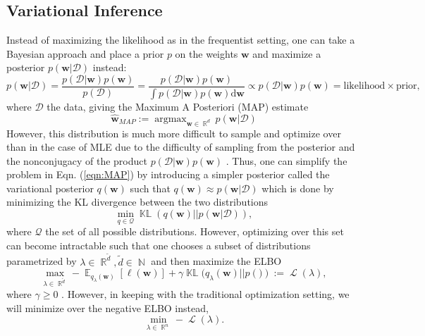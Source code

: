 \documentclass[a4paper, 11pt, oneside]{scrartcl}
\theoremstyle{break}
\DeclareMathOperator*{\argmax}{argmax}
\DeclareMathOperator{\Natural}{\mathbb{N}}
\DeclareMathOperator{\Real}{\mathbb{R}}
\DeclareMathOperator{\Expect}{\mathbb{E}}
\DeclareMathOperator{\ELBO}{\mathcal{L}}
\DeclareMathOperator{\KL}{\mathbb{KL}}
\newcommand{\matr}[1]{\boldsymbol{#1}}
\newcommand{\set}[1]{\mathcal{#1}}
\numberwithin{equation}{section}
\begin{document}
		\subsection{Variational Inference}
			Instead of maximizing the likelihood as in the frequentist setting, one can take a Bayesian approach and place a prior $p$ on the weights $\matr{w}$ and maximize a posterior $p(\matr{w} | \set{D})$ instead:
			\begin{equation}
				p(\matr{w} | \set{D}) = \frac{p(\set{D} | \matr{w}) p(\matr{w})}{p(\set{D})} = \frac{p(\set{D} | \matr{w}) p(\matr{w})}{\int p(\set{D} | \matr{w}) p(\matr{w}) \text{d}\matr{w}} \propto p(\set{D} | \matr{w}) p(\matr{w}) = \text{likelihood} \times \text{prior},
				\label{eqn:BayesRule}
			\end{equation}
			where $\set{D}$ the data, giving the Maximum A Posteriori (MAP) estimate
			\begin{equation}
				\matr{\hat{w}}_{MAP} := \argmax_{\matr{w} \in \Real^d} p(\matr{w} | \set{D})
				\label{eqn:MAP}
			\end{equation}
			However, this distribution is much more difficult to sample and optimize over than in the case of MLE due to the difficulty of sampling from the posterior and the nonconjugacy of the product $p(\set{D} | \matr{w}) p(\matr{w})$ \cite{KNT+18}.
			Thus, one can simplify the problem in Eqn. (\ref{eqn:MAP}) by introducing a simpler posterior called the variational posterior $q(\matr{w})$ such that $q(\matr{w}) \approx p(\matr{w} | \set{D})$ which is done by minimizing the KL divergence between the two distributions 
			$$\min_{q \in \set{Q}} \KL(q(\matr{w}) || p(\matr{w} | \set{D})),$$
			where $\set{Q}$ the set of all possible distributions.
			However, optimizing over this set can become intractable such that one chooses a subset of distributions parametrized by $\lambda \in \Real^{\tilde{d}}, \tilde{d} \in \Natural$ and then maximize the ELBO 
			\begin{equation}
				\max_{\lambda \in \Real^{\tilde{d}}} -\Expect_{q_{\lambda}(\matr{w})}[\ell(\matr{w})] + \gamma \KL(q_{\lambda}(\matr{w}) || p(\matr)) := \ELBO(\lambda),
				\label{eqn:ELBO}
			\end{equation}
			where $\gamma \ge 0$ \cite{ZSD+17, LSK20, LNK+21}.
			However, in keeping with the traditional optimization setting, we will minimize over the negative ELBO instead,
			\begin{equation*}
				\min_{\lambda \in \Real^n} -\ELBO(\lambda).
			\end{equation*}
\end{document}
